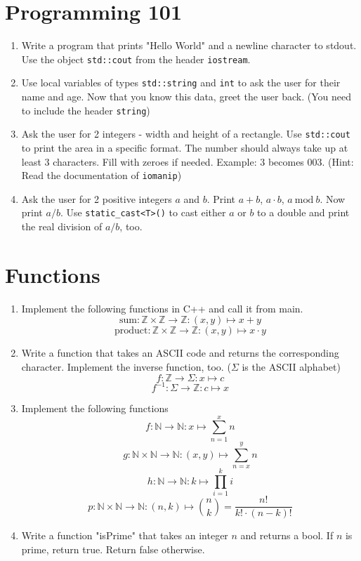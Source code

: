 \documentclass[12pt, a4paper]{article}
\begin{document}
\section*{Programming 101}
\begin{enumerate}
    \item Write a program that prints "Hello World" and a newline character to stdout. Use the object \lstinline{std::cout} from the header \lstinline{iostream}.
    \item Use local variables of types \lstinline{std::string} and \lstinline{int} to ask the user for their name and age. Now that you know this data, greet the user back. (You need to include the header \lstinline{string})
    \item Ask the user for 2 integers - width and height of a rectangle. Use \lstinline{std::cout} to print the area in a specific format. The number should always take up at least 3 characters. Fill with zeroes if needed. Example: 3 becomes 003. (Hint: Read the documentation of \lstinline{iomanip})
    \item Ask the user for 2 positive integers $a$ and $b$. Print $a + b$, $a \cdot b$, $a \ \textrm{mod} \ b$. Now print $a / b$. Use \lstinline{static_cast<T>()} to cast either $a$ or $b$ to a double and print the real division of $a / b$, too.
\end{enumerate}
\section*{Functions}
\begin{enumerate}
    \item Implement the following functions in C++ and call it from main.
    $$ \textrm{sum}: \mathbb{Z} \times \mathbb{Z} \to \mathbb{Z}: (x,y) \mapsto x + y $$
    $$ \textrm{product}: \mathbb{Z} \times \mathbb{Z} \to \mathbb{Z}: (x,y) \mapsto x \cdot y $$
    \item Write a function that takes an ASCII code and returns the corresponding character. Implement the inverse function, too. ($\Sigma$ is the ASCII alphabet)
    $$ f: \mathbb{Z} \to \Sigma: x \mapsto c $$
    $$ f^{-1}: \Sigma \to \mathbb{Z}: c \mapsto x $$
    \item Implement the following functions
    $$f: \mathbb{N} \to \mathbb{N}: x \mapsto \sum_{n=1}^{x} n$$
    $$g: \mathbb{N} \times \mathbb{N} \to \mathbb{N}: (x,y) \mapsto \sum_{n=x}^{y} n $$
    $$h: \mathbb{N} \to \mathbb{N}: k \mapsto \prod_{i=1}^{k} i$$
    $$p: \mathbb{N} \times \mathbb{N} \to \mathbb{N}: (n, k) \mapsto \binom{n}{k} = \frac{n!}{k! \cdot (n-k)!}$$
    \item Write a function "isPrime" that takes an integer $n$ and returns a bool. If $n$ is prime, return true. Return false otherwise.

\end{enumerate}
\end{document}
